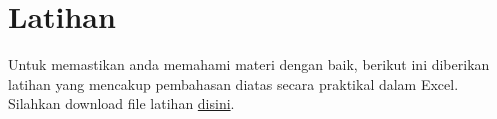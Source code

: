 \documentclass[
]{book}
\begin{document}
\hypertarget{latihan}{%
\section{Latihan}\label{latihan}}

Untuk memastikan anda memahami materi dengan baik, berikut ini diberikan latihan yang mencakup pembahasan diatas secara praktikal dalam Excel. Silahkan download file latihan \href{}{disini}.

  
\end{document}
